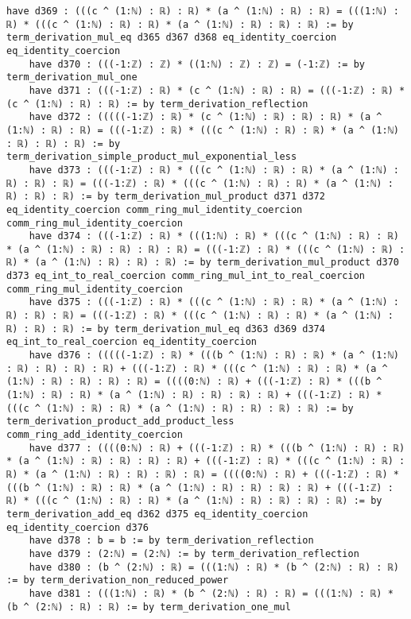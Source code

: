 \documentclass{article}
\begin{document}
\begin{tcolorbox}[colback=white!10, width=\linewidth]
\begin{lstlisting}[language=Lean4]
    have d369 : (((c ^ (1:ℕ) : ℝ) : ℝ) * (a ^ (1:ℕ) : ℝ) : ℝ) = (((1:ℕ) : ℝ) * (((c ^ (1:ℕ) : ℝ) : ℝ) * (a ^ (1:ℕ) : ℝ) : ℝ) : ℝ) := by term_derivation_mul_eq d365 d367 d368 eq_identity_coercion eq_identity_coercion
    have d370 : (((-1:ℤ) : ℤ) * ((1:ℕ) : ℤ) : ℤ) = (-1:ℤ) := by term_derivation_mul_one
    have d371 : (((-1:ℤ) : ℝ) * (c ^ (1:ℕ) : ℝ) : ℝ) = (((-1:ℤ) : ℝ) * (c ^ (1:ℕ) : ℝ) : ℝ) := by term_derivation_reflection
    have d372 : (((((-1:ℤ) : ℝ) * (c ^ (1:ℕ) : ℝ) : ℝ) : ℝ) * (a ^ (1:ℕ) : ℝ) : ℝ) = (((-1:ℤ) : ℝ) * (((c ^ (1:ℕ) : ℝ) : ℝ) * (a ^ (1:ℕ) : ℝ) : ℝ) : ℝ) := by term_derivation_simple_product_mul_exponential_less
    have d373 : (((-1:ℤ) : ℝ) * (((c ^ (1:ℕ) : ℝ) : ℝ) * (a ^ (1:ℕ) : ℝ) : ℝ) : ℝ) = (((-1:ℤ) : ℝ) * (((c ^ (1:ℕ) : ℝ) : ℝ) * (a ^ (1:ℕ) : ℝ) : ℝ) : ℝ) := by term_derivation_mul_product d371 d372 eq_identity_coercion comm_ring_mul_identity_coercion comm_ring_mul_identity_coercion
    have d374 : (((-1:ℤ) : ℝ) * (((1:ℕ) : ℝ) * (((c ^ (1:ℕ) : ℝ) : ℝ) * (a ^ (1:ℕ) : ℝ) : ℝ) : ℝ) : ℝ) = (((-1:ℤ) : ℝ) * (((c ^ (1:ℕ) : ℝ) : ℝ) * (a ^ (1:ℕ) : ℝ) : ℝ) : ℝ) := by term_derivation_mul_product d370 d373 eq_int_to_real_coercion comm_ring_mul_int_to_real_coercion comm_ring_mul_identity_coercion
    have d375 : (((-1:ℤ) : ℝ) * (((c ^ (1:ℕ) : ℝ) : ℝ) * (a ^ (1:ℕ) : ℝ) : ℝ) : ℝ) = (((-1:ℤ) : ℝ) * (((c ^ (1:ℕ) : ℝ) : ℝ) * (a ^ (1:ℕ) : ℝ) : ℝ) : ℝ) := by term_derivation_mul_eq d363 d369 d374 eq_int_to_real_coercion eq_identity_coercion
    have d376 : (((((-1:ℤ) : ℝ) * (((b ^ (1:ℕ) : ℝ) : ℝ) * (a ^ (1:ℕ) : ℝ) : ℝ) : ℝ) : ℝ) + (((-1:ℤ) : ℝ) * (((c ^ (1:ℕ) : ℝ) : ℝ) * (a ^ (1:ℕ) : ℝ) : ℝ) : ℝ) : ℝ) = ((((0:ℕ) : ℝ) + (((-1:ℤ) : ℝ) * (((b ^ (1:ℕ) : ℝ) : ℝ) * (a ^ (1:ℕ) : ℝ) : ℝ) : ℝ) : ℝ) + (((-1:ℤ) : ℝ) * (((c ^ (1:ℕ) : ℝ) : ℝ) * (a ^ (1:ℕ) : ℝ) : ℝ) : ℝ) : ℝ) := by term_derivation_product_add_product_less comm_ring_add_identity_coercion
    have d377 : ((((0:ℕ) : ℝ) + (((-1:ℤ) : ℝ) * (((b ^ (1:ℕ) : ℝ) : ℝ) * (a ^ (1:ℕ) : ℝ) : ℝ) : ℝ) : ℝ) + (((-1:ℤ) : ℝ) * (((c ^ (1:ℕ) : ℝ) : ℝ) * (a ^ (1:ℕ) : ℝ) : ℝ) : ℝ) : ℝ) = ((((0:ℕ) : ℝ) + (((-1:ℤ) : ℝ) * (((b ^ (1:ℕ) : ℝ) : ℝ) * (a ^ (1:ℕ) : ℝ) : ℝ) : ℝ) : ℝ) + (((-1:ℤ) : ℝ) * (((c ^ (1:ℕ) : ℝ) : ℝ) * (a ^ (1:ℕ) : ℝ) : ℝ) : ℝ) : ℝ) := by term_derivation_add_eq d362 d375 eq_identity_coercion eq_identity_coercion d376
    have d378 : b = b := by term_derivation_reflection
    have d379 : (2:ℕ) = (2:ℕ) := by term_derivation_reflection
    have d380 : (b ^ (2:ℕ) : ℝ) = (((1:ℕ) : ℝ) * (b ^ (2:ℕ) : ℝ) : ℝ) := by term_derivation_non_reduced_power
    have d381 : (((1:ℕ) : ℝ) * (b ^ (2:ℕ) : ℝ) : ℝ) = (((1:ℕ) : ℝ) * (b ^ (2:ℕ) : ℝ) : ℝ) := by term_derivation_one_mul

\end{lstlisting}
\end{tcolorbox}
\end{document}

